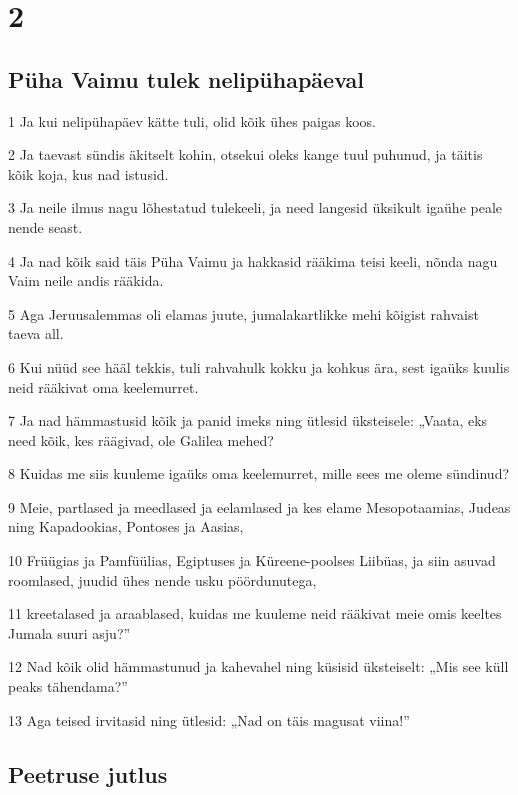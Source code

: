 \chapter{2}

\section*{Püha Vaimu tulek nelipühapäeval}

\par 1 Ja kui nelipühapäev kätte tuli, olid kõik ühes paigas koos.
\par 2 Ja taevast sündis äkitselt kohin, otsekui oleks kange tuul puhunud, ja täitis kõik koja, kus nad istusid.
\par 3 Ja neile ilmus nagu lõhestatud tulekeeli, ja need langesid üksikult igaühe peale nende seast.
\par 4 Ja nad kõik said täis Püha Vaimu ja hakkasid rääkima teisi keeli, nõnda nagu Vaim neile andis rääkida.
\par 5 Aga Jeruusalemmas oli elamas juute, jumalakartlikke mehi kõigist rahvaist taeva all.
\par 6 Kui nüüd see hääl tekkis, tuli rahvahulk kokku ja kohkus ära, sest igaüks kuulis neid rääkivat oma keelemurret.
\par 7 Ja nad hämmastusid kõik ja panid imeks ning ütlesid üksteisele: „Vaata, eks need kõik, kes räägivad, ole Galilea mehed?
\par 8 Kuidas me siis kuuleme igaüks oma keelemurret, mille sees me oleme sündinud?
\par 9 Meie, partlased ja meedlased ja eelamlased ja kes elame Mesopotaamias, Judeas ning Kapadookias, Pontoses ja Aasias,
\par 10 Früügias ja Pamfüülias, Egiptuses ja Küreene-poolses Liibüas, ja siin asuvad roomlased, juudid ühes nende usku pöördunutega,
\par 11 kreetalased ja araablased, kuidas me kuuleme neid rääkivat meie omis keeltes Jumala suuri asju?”
\par 12 Nad kõik olid hämmastunud ja kahevahel ning küsisid üksteiselt: „Mis see küll peaks tähendama?”
\par 13 Aga teised irvitasid ning ütlesid: „Nad on täis magusat viina!”

\section*{Peetruse jutlus}

